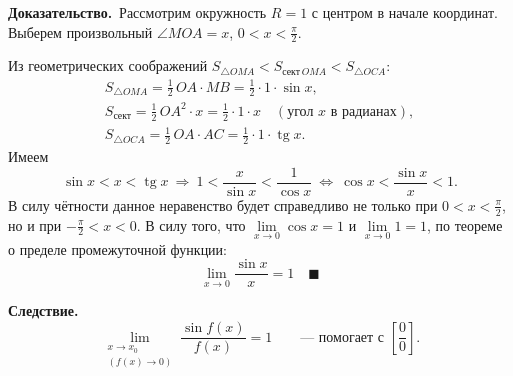 \documentclass[a4paper,11pt]{article}
\newcommand{\dok}{\textbf{Доказательство.}\ }
\begin{document}
\dok Рассмотрим окружность $R = 1$ с центром в начале
координат. Выберем произвольный $\angle MOA = x$, $0 < x < \frac{\pi}{2}$.

\begin{center}
\end{center}

Из геометрических соображений
$S_{\triangle OMA} < S_{\text{сект}\,OMA} < S_{\triangle OCA}$:
\begin{gather*}
  S_{\triangle OMA} = \frac{1}{2}\, OA \cdot MB = \frac{1}{2} \cdot 1 \cdot \sin x, \\
  S_{\text{сект}} = \frac{1}{2}\, OA^2 \cdot x = \frac{1}{2} \cdot 1 \cdot x
  \quad (\text{угол } x \text{ в радианах}), \\
  S_{\triangle OCA} = \frac{1}{2}\, OA \cdot AC = \frac{1}{2} \cdot 1 \cdot \operatorname{tg} x.
\end{gather*}
Имеем
\[
  \sin x < x < \operatorname{tg} x
  \ \Longrightarrow\ 1 < \frac{x}{\sin x} < \frac{1}{\cos x}
  \ \Longleftrightarrow\ \cos x < \frac{\sin x}{x} < 1.
\]
В силу чётности данное неравенство будет справедливо не только при
$0 < x < \frac{\pi}{2}$, но и при $-\frac{\pi}{2} < x < 0$. В силу того, что
$\lim\limits_{x \to 0} \cos x = 1$ и $\lim\limits_{x \to 0} 1 = 1$, по теореме о пределе
промежуточной функции:
\[
  \boxed{\lim_{x \to 0} \frac{\sin x}{x} = 1}\quad\blacksquare
\]

\textbf{Следствие.}
\[
  \lim_{\substack{x \to x_0\\ (f(x) \to 0)}} \frac{\sin f(x)}{f(x)} = 1
  \qquad \text{--- помогает с } \left[\frac{0}{0}\right].
\]
\end{document}
